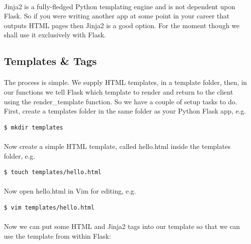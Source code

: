 \documentclass[12pt, a4paper, twoside]{book}
\begin{document}
\paragraph{} Jinja2 is a fully-fledged Python templating engine and is not dependent upon Flask. So if you were writing another app at some point in your career that outputs HTML pages then Jinja2 is a good option. For the moment though we shall use it exclusively with Flask.


\subsection{Templates \& Tags}
\label{templates-tags}
\paragraph{} The process is simple. We supply HTML templates, in a template folder, then, in our functions we tell Flask which template to render and return to the client using the render\_template function. So we have a couple of setup tasks to do. First, create a templates folder in the same folder as your Python Flask app, e.g.

\begin{lstlisting}[style=DOS]
$ mkdir templates
\end{lstlisting}

\paragraph{} Now create a simple HTML template, called hello.html inside the templates folder, e.g.
\begin{lstlisting}[style=DOS]
$ touch templates/hello.html
\end{lstlisting}

\paragraph{} Now open hello.html in Vim for editing, e.g.
\begin{lstlisting}[style=DOS]
$ vim templates/hello.html
\end{lstlisting}

\paragraph{} Now we can put some HTML and Jinja2 tags into our template so that we can use the template from within Flask:
\end{document}
